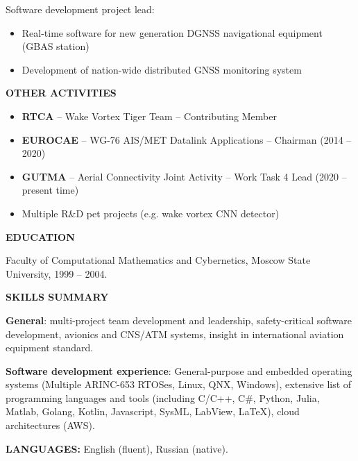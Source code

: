 \documentclass[a4paper]{article}
\begin{document}
    Software development project lead:
	\begin{itemize}
		\setlength{\itemindent}{.5cm}
	    \item Real-time software for new generation DGNSS navigational equipment (GBAS station)
	    \item Development of nation-wide distributed GNSS monitoring system
    \end{itemize}
    \vspace{3mm}
    
    \textbf{OTHER ACTIVITIES}

	\begin{itemize}
	    \setlength{\itemindent}{.5cm}	
	    \item \textbf{RTCA} -- Wake Vortex Tiger Team -- Contributing Member
	    \item \textbf{EUROCAE} -- WG-76 AIS/MET Datalink Applications -- Chairman (2014 -- 2020)
	    \item \textbf{GUTMA} -- Aerial Connectivity Joint Activity -- Work Task 4 Lead (2020 -- present time)
	    \item Multiple R\&D pet projects (e.g. wake vortex CNN detector)
    \end{itemize}
    \vspace{3mm}
    
    \textbf{EDUCATION}
    \vspace{3mm}
    
    Faculty of Computational Mathematics and Cybernetics, Moscow State University, 1999 -- 2004.
    \vspace{5mm}
    
    \textbf{SKILLS SUMMARY}
    \vspace{3mm}
    
    \textbf{General}: multi-project team development and leadership, safety-critical software development, avionics and CNS/ATM systems, insight in international aviation equipment standard.
    \vspace{3mm}
    
    \textbf{Software development experience}: General-purpose and embedded operating systems (Multiple ARINC-653 RTOSes, Linux, QNX, Windows), extensive list of programming languages and tools (including C/C++, C\#, Python, Julia, Matlab, Golang, Kotlin, Javascript, SysML, LabView, LaTeX), cloud architectures (AWS).
    \vspace{5mm}
    
    \textbf{LANGUAGES:} English (fluent), Russian (native).
\end{document}
